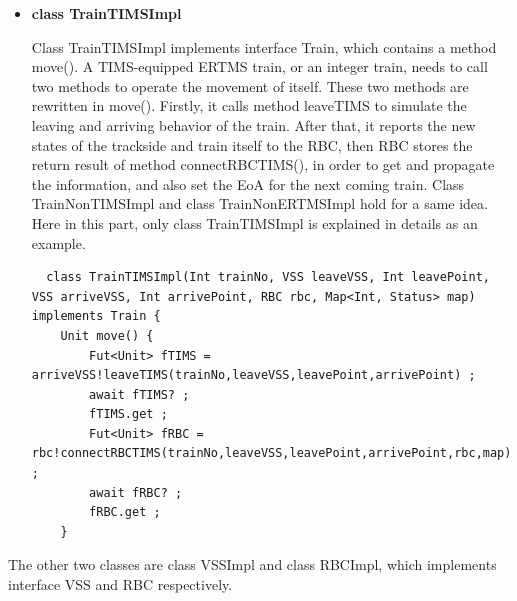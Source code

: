 \documentclass[article,dr=phil,type=msc,colorback,accentcolor=tud9c]{tudthesis}
\begin{document}
  \begin{itemize}	
  	
  \item \textbf{class TrainTIMSImpl}
  
  Class TrainTIMSImpl implements interface Train, which contains a method move(). A TIMS-equipped ERTMS train, or an integer train, needs to call two methods to operate the movement of itself. These two methods are rewritten in move(). Firstly, it calls method leaveTIMS to simulate the leaving and arriving behavior of the train. After that, it reports the new states of the trackside and train itself to the RBC, then RBC stores the return result of method connectRBCTIMS(), in order to get and propagate the information, and also set the EoA for the next coming train. Class TrainNonTIMSImpl and class TrainNonERTMSImpl hold for a same idea. Here in this part, only class TrainTIMSImpl is explained in details as an example.
  
  \begin{lstlisting}
  class TrainTIMSImpl(Int trainNo, VSS leaveVSS, Int leavePoint, VSS arriveVSS, Int arrivePoint, RBC rbc, Map<Int, Status> map) implements Train {
  	Unit move() {  
  		Fut<Unit> fTIMS = arriveVSS!leaveTIMS(trainNo,leaveVSS,leavePoint,arrivePoint) ;
  		await fTIMS? ;
  		fTIMS.get ;
  		Fut<Unit> fRBC = rbc!connectRBCTIMS(trainNo,leaveVSS,leavePoint,arrivePoint,rbc,map) ;
  		await fRBC? ;
  		fRBC.get ;
  	}\end{lstlisting}
  \end{itemize}

  The other two classes are class VSSImpl and class RBCImpl, which implements interface VSS and RBC respectively.
\end{document}
